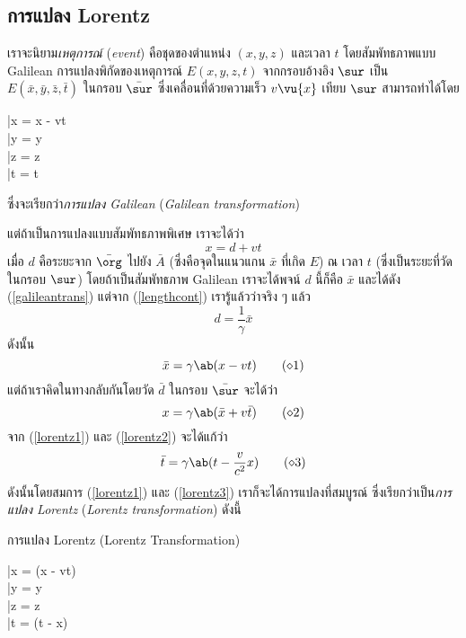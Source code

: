 \subsection{การแปลง Lorentz}

เราจะนิยาม\emph{เหตุการณ์} (\emph{event}) คือชุดของตำแหน่ง $(x,y,z)$ และเวลา $t$ โดยสัมพัทธภาพแบบ Galilean การแปลงพิกัดของเหตุการณ์ $E(x,y,z,t)$ จากกรอบอ้างอิง $\sur$ เป็น $E(\bar{x}, \bar{y}, \bar{z}, \bar{t})$ ในกรอบ $\bar{\sur}$ ซึ่งเคลื่อนที่ด้วยความเร็ว $v\vu{x}$ เทียบ $\sur$ สามารถทำได้โดย
\begin{eqnobox}
    \begin{rcases}
        \bar{x} = x - vt\hspace{5pt}\\
        \bar{y} = y\\
        \bar{z} = z\\
        \bar{t} = t
    \end{rcases}\label{galileantrans}
\end{eqnobox}
ซึ่งจะเรียกว่า\emph{การแปลง Galilean} (\emph{Galilean transformation})

แต่ถ้าเป็นการแปลงแบบสัมพัทธภาพพิเศษ เราจะได้ว่า
\[
x = d + vt
\]
เมื่อ $d$ คือระยะจาก $\bar{\org}$ ไปยัง $\bar{A}$ (ซึ่งคือจุดในแนวแกน $\bar{x}$ ที่เกิด $E$) ณ เวลา $t$ (ซึ่งเป็นระยะที่วัดในกรอบ $\sur$) โดยถ้าเป็นสัมพัทธภาพ Galilean เราจะได้พจน์ $d$ นี้ก็คือ $\bar{x}$ และได้ดัง (\ref{galileantrans}) แต่จาก (\ref{lengthcont}) เรารู้แล้วว่าจริง ๆ แล้ว
\[
d = \frac{1}{\gamma}\bar{x}
\]
ดังนั้น
\begin{equation}
    \bar{x} = \gamma\ab(x - vt)\tag{$\diamond$1}\label{lorentz1}
\end{equation}
แต่ถ้าเราคิดในทางกลับกันโดยวัด $\bar{d}$ ในกรอบ $\bar{\sur}$ จะได้ว่า
\begin{equation}
    x = \gamma\ab(\bar{x} + v\bar{t})\tag{$\diamond$2}\label{lorentz2}
\end{equation}
จาก (\ref{lorentz1}) และ (\ref{lorentz2}) จะได้แก้ว่า
\begin{equation}
    \bar{t} = \gamma\ab(t - \frac{v}{c^2}x)\tag{$\diamond$3}\label{lorentz3}
\end{equation}
ดังนั้นโดยสมการ (\ref{lorentz1}) และ (\ref{lorentz3}) เราก็จะได้การแปลงที่สมบูรณ์ ซึ่งเรียกว่าเป็น\emph{การแปลง Lorentz} (\emph{Lorentz transformation}) ดังนี้
\begin{eqbox}{การแปลง Lorentz (Lorentz Transformation)}
    \begin{rcases}
        \bar{x} = \gamma(x - vt)\hspace{5pt}\\
        \bar{y} = y\\
        \bar{z} = z\\
        \bar{t} = \gamma\ab(t - x)
    \end{rcases}\label{lorentztrans}
\end{eqbox}

